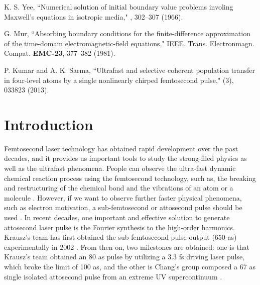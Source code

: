 \documentclass[10pt,letterpaper]{article}
\begin{document}
\begin{thebibliography}{99}
K. S. Yee, ``Numerical solution of initial boundary value problems involing Maxwell's equations in isotropic media," , 302--307 (1966).

G. Mur, ``Absorbing boundary conditions for the finite-difference approximation of the time-domain electromagnetic-field equations," IEEE. Trans. Electronmagn. Compat. {\bf EMC-23}, 377--382 (1981).

P. Kumar and A. K. Sarma, ``Ultrafast and selective coherent population transfer in four-level atoms by a single nonlinearly chirped femtosecond pulse," (3), 033823 (2013).
	
\end{thebibliography}

\section{Introduction}
Femtosecond laser technology has obtained rapid development over the past decades, and it provides us important tools to study the strong-filed physics as well as the ultrafast phenomena. People can observe the ultra-fast dynamic chemical reaction process using the femtosecond technology, such as, the breaking and restructuring of the chemical bond \cite{Mokhtari-chemical-bond-Nature-1990} and the vibrations of an atom or a molecule \cite{Ergler-Vibration-PRL-2006}. However, if we want to observe further faster physical phenomena, such as electron motivation, a sub-femtosecond or attosecond pulse should be used \cite{Uiberacker-Attosecond-real-time-Nature-2007}. In recent decades, one important and effective solution to generate attosecond laser pulse is the Fourier synthesis to the high-order harmonics. Krausz's team has first obtained the sub-femtosecond pulse output (650 as) experimentally in 2002 \cite{Krausz-Attosecon-Review-2009}. From then on, two milestones are obtained: one is that Krausz's team \cite{Krausz-Attosecon-Review-2009} obtained an 80 as pulse by utilizing a 3.3 fs driving laser pulse, which broke the limit of 100 as, and the other is Chang's group composed a 67 as single isolated attosecond pulse from an extreme UV supercontinuum \cite{Chang2012-OL-67as}.
\end{document}

